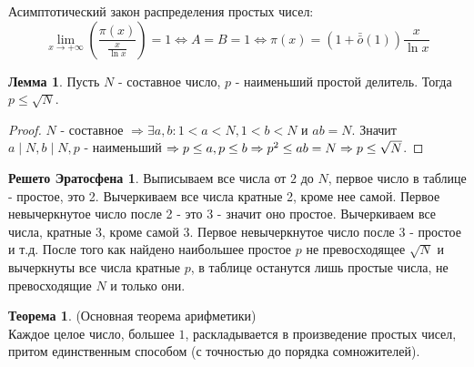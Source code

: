 \documentclass[a4paper, 12pt]{article}
\newcommand{\lra}{\Leftrightarrow}
\renewcommand{\div}{\mid}
\newcommand{\om}{\bar{\bar{o}}}
\theoremstyle{definition}
\newtheorem{theorem}{Теорема}[section]
\newtheorem{lemma}{Лемма}[section]
\newtheorem*{eratosphene}{Решето Эратосфена}
\begin{document}
    Асимптотический закон распределения простых чисел:
    $$\lim\limits_{x\to +\infty}(\frac{\pi(x)}{\frac{x}{\ln x}})=1 \lra A=B=1 \lra \pi(x)=(1+\om(1))\frac{x}{\ln x}$$
    \begin{lemma} \label{lemma5.2}
        Пусть $N$ - составное число, $p$ - наименьший простой делитель. Тогда $p\leq \sqrt{N}$.
    \end{lemma} 
    \begin{proof}
        $N$ - составное $\Rightarrow \exists a,b: 1<a<N, 1<b<N$ и $ab=N$. Значит $a\div N, b\div N, p$ - наименьший $\Rightarrow p\leq a, p\leq b \Rightarrow p^2\leq ab=N\\ \Rightarrow p\leq \sqrt{N}$.
     \end{proof}
    \begin{eratosphene}
        Выписываем все числа от $2$ до $N$, первое число в таблице - простое, это 2. Вычеркиваем все числа кратные 2, кроме нее самой. Первое невычеркнутое число после 2 - это 3 - значит оно простое. Вычеркиваем все числа, кратные 3, кроме самой 3. Первое невычеркнутое число после 3 - простое и т.д. После того как найдено наибольшее простое $p$ не превосходящее $\sqrt{N}$ и вычеркнуты все числа кратные $p$, в таблице останутся лишь простые числа, не превосходящие $N$ и только они.
    \end{eratosphene}
    \begin{theorem} \label{th5.2}
        (Основная теорема арифметики)\\
        Каждое целое число, большее $1$, раскладывается в произведение простых чисел, притом единственным способом (с точностью до порядка сомножителей). 
    \end{theorem}
\end{document}
